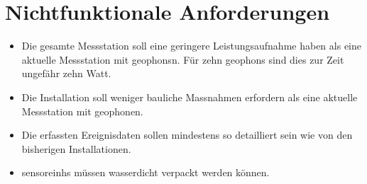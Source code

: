 %
%

\thispagestyle{empty}
\chapter{Nichtfunktionale Anforderungen}\label{chap.nichtfunktionale}

\begin{itemize}
\item Die gesamte Messstation soll eine geringere Leistungsaufnahme haben als eine aktuelle Messstation mit \glspl{geophon}n. Für zehn \glspl{geophon} sind dies zur Zeit ungefähr zehn Watt.

\item Die Installation soll weniger bauliche Massnahmen erfordern als eine aktuelle Messstation mit \gls{geophon}en.

\item Die erfassten Ereignisdaten sollen mindestens so detailliert sein wie von den bisherigen Installationen.

\item \glspl{sensoreinh} müssen wasserdicht verpackt werden können.
\
\end{itemize}
